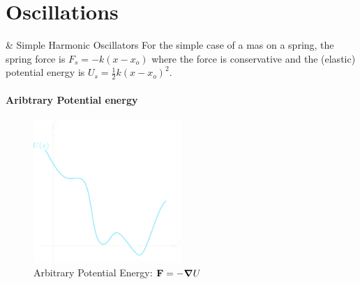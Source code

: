 \documentclass[../main.tex]{subfiles}
\begin{document}
\section{Oscillations}

\& Simple Harmonic Oscillators For the simple case of a mas on a spring, the spring force is
$F_{s} = -k(x - x_o)$
where the force is conservative and the (elastic) potential energy is
$U_s = \frac{1}{2} k (x - x_o)^2$.

\paragraph*{Aribtrary Potential energy} 
\begin{figure}[ht]
    \centering
    \includegraphics[width=0.5\textwidth]{5_1.png}
    \caption{Arbitrary Potential Energy: $\vb{F} = - \grad U$}
    \label{fig:fig1}
\end{figure}
\end{document}
